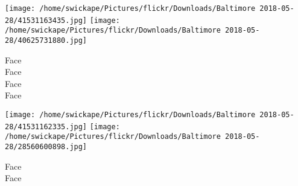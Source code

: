 \documentclass[10pt,letterpaper]{article}
\begin{document}
\texttt{[image: /home/swickape/Pictures/flickr/Downloads/Baltimore 2018-05-28/41531163435.jpg]}
\texttt{[image: /home/swickape/Pictures/flickr/Downloads/Baltimore 2018-05-28/40625731880.jpg]}

Face\\
Face\\
Face\\
Face
\pagebreak

\texttt{[image: /home/swickape/Pictures/flickr/Downloads/Baltimore 2018-05-28/41531162335.jpg]}
\texttt{[image: /home/swickape/Pictures/flickr/Downloads/Baltimore 2018-05-28/28560600898.jpg]}

Face\\
Face
\pagebreak
\end{document}
